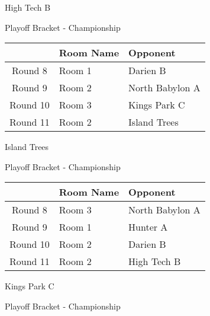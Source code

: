 \documentclass{article}%
\begin{document}
\vspace*{80pt}%
\linebreak%
\newpage%
\begin{center}%
\begin{Huge}%
High Tech B%
\end{Huge}%
\vspace*{12pt}%
\linebreak%
\begin{Large}%
Playoff Bracket {-} Championship%
\end{Large}%
\end{center}%
\vspace*{4pt}%
%
\begin{tabularx}{\textwidth}{|c|Y|Y|}%
\hline%
&Room Name&Opponent\\%
\hline%
Round 8&Room 1&Darien B\\%
Round 9&Room 2&North Babylon A\\%
Round 10&Room 3&Kings Park C\\%
Round 11&Room 2&Island Trees\\%
\hline%
\end{tabularx}%
\vspace*{80pt}%
\linebreak%
\newpage%
\begin{center}%
\begin{Huge}%
Island Trees%
\end{Huge}%
\vspace*{12pt}%
\linebreak%
\begin{Large}%
Playoff Bracket {-} Championship%
\end{Large}%
\end{center}%
\vspace*{4pt}%
%
\begin{tabularx}{\textwidth}{|c|Y|Y|}%
\hline%
&Room Name&Opponent\\%
\hline%
Round 8&Room 3&North Babylon A\\%
Round 9&Room 1&Hunter A\\%
Round 10&Room 2&Darien B\\%
Round 11&Room 2&High Tech B\\%
\hline%
\end{tabularx}%
\vspace*{80pt}%
\linebreak%
\newpage%
\begin{center}%
\begin{Huge}%
Kings Park C%
\end{Huge}%
\vspace*{12pt}%
\linebreak%
\begin{Large}%
Playoff Bracket {-} Championship%
\end{Large}%
\end{center}%
\end{document}
